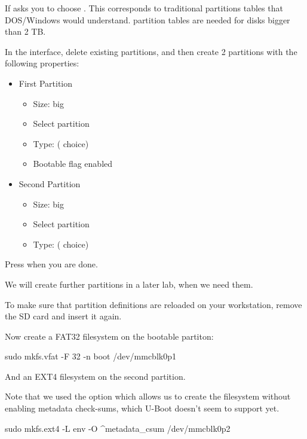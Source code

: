 

If  asks you to  choose .
This corresponds to traditional partitions tables that DOS/Windows would 
understand.  partition tables are needed for disks bigger than 2 TB.

In the  interface, delete existing partitions, and then create 2
partitions with the following properties:

\begin{itemize}
\item First Partition
\begin{itemize}
  \item Size:  big
  \item Select  partition
  \item Type:   ( choice)
  \item Bootable flag enabled
\end{itemize}

\item Second Partition
\begin{itemize}
  \item Size:  big
  \item Select  partition
  \item Type:   ( choice)
\end{itemize}
\end{itemize}


Press  when you are done.

We will create further partitions in a later lab, when we need them.

To make sure that partition definitions are reloaded on your
workstation, remove the SD card and insert it again.

Now create a FAT32 filesystem on the bootable partiton:
\begin{bashinput}
sudo mkfs.vfat -F 32 -n boot /dev/mmcblk0p1
\end{bashinput}

And an EXT4 filesystem on the second partition.

Note that we used the  option which allows us to create
the filesystem without enabling metadata check-sums, which U-Boot doesn't
seem to support yet.
\begin{bashinput}
sudo mkfs.ext4 -L env -O ^metadata_csum /dev/mmcblk0p2
\end{bashinput}

